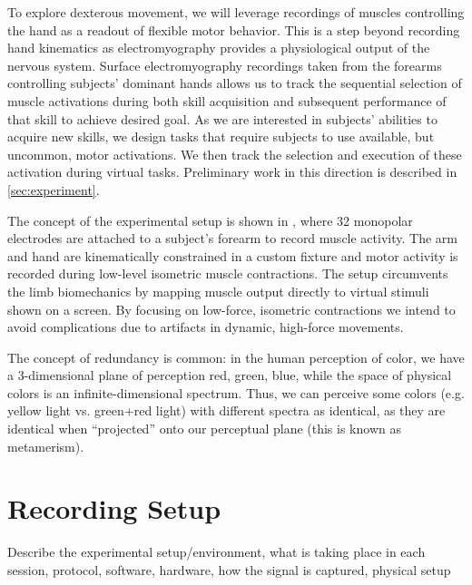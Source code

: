 \documentclass[../main.tex]{subfiles}
\begin{document}
To explore dexterous movement, we will leverage recordings of muscles controlling the hand as a readout of flexible motor behavior. This is a step beyond recording hand kinematics as electromyography provides a physiological output of the nervous system. Surface electromyography recordings taken from the forearms controlling subjects' dominant hands allows us to track the sequential selection of muscle activations during both skill acquisition and subsequent performance of that skill to achieve desired goal. As we are interested in subjects' abilities to acquire new skills, we design tasks that require subjects to use available, but uncommon, motor activations. We then track the selection and execution of these activation during virtual tasks. Preliminary work in this direction is described in \cref{sec:experiment}.

The concept of the experimental setup is shown in , where 32 monopolar electrodes are attached to a subject's forearm to record muscle activity. The arm and hand are kinematically constrained in a custom fixture and motor activity is recorded during low-level isometric muscle contractions. The setup circumvents the limb biomechanics by mapping muscle output directly to virtual stimuli shown on a screen. By focusing on low-force, isometric contractions we intend to avoid complications due to artifacts in dynamic, high-force movements.

The concept of redundancy is common: in the human perception of color, we have a 3-dimensional plane of perception red, green, blue, while the space of physical colors is an infinite-dimensional spectrum. Thus, we can perceive some colors (e.g. yellow light vs. green+red light) with different spectra as identical, as they are identical when ``projected'' onto our perceptual plane (this is known as metamerism).


\section{Recording Setup}\label{hardware}

Describe the experimental setup/environment, what is taking place in each session, protocol, software, hardware, how the signal is captured, physical setup
\end{document}
